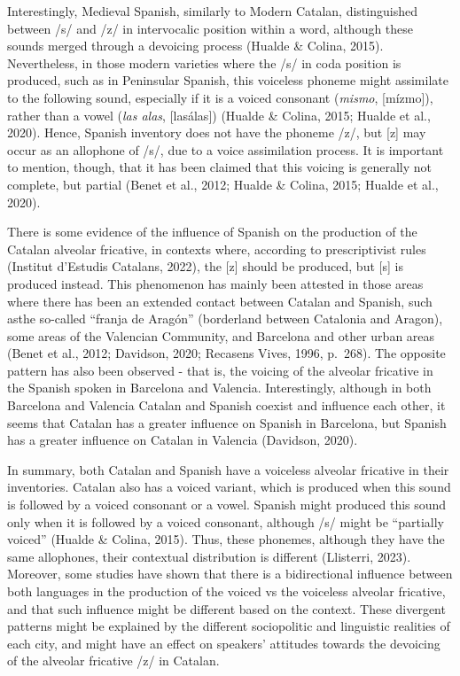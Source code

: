 \documentclass[
  a4paper,
  11pt,
  twocolumn]{article}
\begin{document}
Interestingly, Medieval Spanish, similarly to Modern Catalan,
distinguished between /s/ and /z/ in intervocalic position within a
word, although these sounds merged through a devoicing process (Hualde
\& Colina, 2015). Nevertheless, in those modern varieties where the /s/
in coda position is produced, such as in Peninsular Spanish, this
voiceless phoneme might assimilate to the following sound, especially if
it is a voiced consonant (\emph{mismo}, {[}mízmo{]}), rather than a
vowel (\emph{las alas}, {[}lasálas{]}) (Hualde \& Colina, 2015; Hualde
et al., 2020). Hence, Spanish inventory does not have the phoneme /z/,
but {[}z{]} may occur as an allophone of /s/, due to a voice
assimilation process. It is important to mention, though, that it has
been claimed that this voicing is generally not complete, but partial
(Benet et al., 2012; Hualde \& Colina, 2015; Hualde et al., 2020).

There is some evidence of the influence of Spanish on the production of
the Catalan alveolar fricative, in contexts where, according to
prescriptivist rules (Institut d'Estudis Catalans, 2022), the {[}z{]}
should be produced, but {[}s{]} is produced instead. This phenomenon has
mainly been attested in those areas where there has been an extended
contact between Catalan and Spanish, such asthe so-called ``franja de
Aragón'' (borderland between Catalonia and Aragon), some areas of the
Valencian Community, and Barcelona and other urban areas (Benet et al.,
2012; Davidson, 2020; Recasens Vives, 1996, p.~268). The opposite
pattern has also been observed - that is, the voicing of the alveolar
fricative in the Spanish spoken in Barcelona and Valencia.
Interestingly, although in both Barcelona and Valencia Catalan and
Spanish coexist and influence each other, it seems that Catalan has a
greater influence on Spanish in Barcelona, but Spanish has a greater
influence on Catalan in Valencia (Davidson, 2020).

In summary, both Catalan and Spanish have a voiceless alveolar fricative
in their inventories. Catalan also has a voiced variant, which is
produced when this sound is followed by a voiced consonant or a vowel.
Spanish might produced this sound only when it is followed by a voiced
consonant, although /s/ might be ``partially voiced'' (Hualde \& Colina,
2015). Thus, these phonemes, although they have the same allophones,
their contextual distribution is different (Llisterri, 2023). Moreover,
some studies have shown that there is a bidirectional influence between
both languages in the production of the voiced vs the voiceless alveolar
fricative, and that such influence might be different based on the
context. These divergent patterns might be explained by the different
sociopolitic and linguistic realities of each city, and might have an
effect on speakers' attitudes towards the devoicing of the alveolar
fricative /z/ in Catalan.
\end{document}
